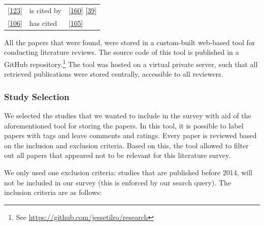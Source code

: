 \documentclass[]{book}
\let\rmarkdownfootnote\footnote%
\def\footnote{\protect\rmarkdownfootnote}
\begin{document}
\begin{longtable}[]{@{}lll@{}}
\begin{minipage}[t]{0.23\columnwidth}\raggedright\strut
{[}\protect\hyperlink{ref-mantyla2015a}{123}{]}\strut
\end{minipage} & \begin{minipage}[t]{0.18\columnwidth}\raggedright\strut
is cited by\strut
\end{minipage} & \begin{minipage}[t]{0.25\columnwidth}\raggedright\strut
{[}\protect\hyperlink{ref-rodriguez2017a}{160}{]}
{[}\protect\hyperlink{ref-cesar2017a}{39}{]}\strut
\end{minipage}\tabularnewline
\begin{minipage}[t]{0.23\columnwidth}\raggedright\strut
{[}\protect\hyperlink{ref-laukkanen2018a}{106}{]}\strut
\end{minipage} & \begin{minipage}[t]{0.18\columnwidth}\raggedright\strut
has cited\strut
\end{minipage} & \begin{minipage}[t]{0.25\columnwidth}\raggedright\strut
{[}\protect\hyperlink{ref-laukkanen2017a}{105}{]}\strut
\end{minipage}\tabularnewline
\bottomrule
\end{longtable}

All the papers that were found, were stored in a custom-built web-based
tool for conducting literature reviews. The source code of this tool is
published in a GitHub repository.\footnote{See
  \url{https://github.com/jessetilro/research}} The tool was hosted on a
virtual private server, such that all retrieved publications were stored
centrally, accessible to all reviewers.

\subsubsection{Study Selection}\label{study-selection}

We selected the studies that we wanted to include in the survey with aid
of the aforementioned tool for storing the papers. In this tool, it is
possible to label papers with tags and leave comments and ratings. Every
paper is reviewed based on the inclusion and exclusion criteria. Based
on this, the tool allowed to filter out all papers that appeared not to
be relevant for this literature survey.

We only used one exclusion criteria: studies that are published before
2014, will not be included in our survey (this is enforced by our search
query). The inclusion criteria are as follows:
\end{document}
